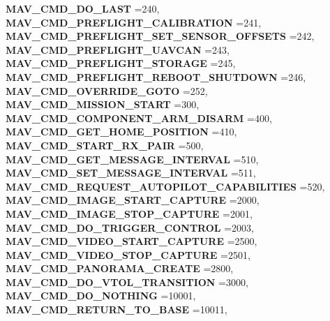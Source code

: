 \begin{DoxyCompactItemize}
\textbf{ M\+A\+V\+\_\+\+C\+M\+D\+\_\+\+D\+O\+\_\+\+L\+A\+ST} =240, 
\textbf{ M\+A\+V\+\_\+\+C\+M\+D\+\_\+\+P\+R\+E\+F\+L\+I\+G\+H\+T\+\_\+\+C\+A\+L\+I\+B\+R\+A\+T\+I\+ON} =241, 
\newline
\textbf{ M\+A\+V\+\_\+\+C\+M\+D\+\_\+\+P\+R\+E\+F\+L\+I\+G\+H\+T\+\_\+\+S\+E\+T\+\_\+\+S\+E\+N\+S\+O\+R\+\_\+\+O\+F\+F\+S\+E\+TS} =242, 
\textbf{ M\+A\+V\+\_\+\+C\+M\+D\+\_\+\+P\+R\+E\+F\+L\+I\+G\+H\+T\+\_\+\+U\+A\+V\+C\+AN} =243, 
\textbf{ M\+A\+V\+\_\+\+C\+M\+D\+\_\+\+P\+R\+E\+F\+L\+I\+G\+H\+T\+\_\+\+S\+T\+O\+R\+A\+GE} =245, 
\textbf{ M\+A\+V\+\_\+\+C\+M\+D\+\_\+\+P\+R\+E\+F\+L\+I\+G\+H\+T\+\_\+\+R\+E\+B\+O\+O\+T\+\_\+\+S\+H\+U\+T\+D\+O\+WN} =246, 
\newline
\textbf{ M\+A\+V\+\_\+\+C\+M\+D\+\_\+\+O\+V\+E\+R\+R\+I\+D\+E\+\_\+\+G\+O\+TO} =252, 
\textbf{ M\+A\+V\+\_\+\+C\+M\+D\+\_\+\+M\+I\+S\+S\+I\+O\+N\+\_\+\+S\+T\+A\+RT} =300, 
\textbf{ M\+A\+V\+\_\+\+C\+M\+D\+\_\+\+C\+O\+M\+P\+O\+N\+E\+N\+T\+\_\+\+A\+R\+M\+\_\+\+D\+I\+S\+A\+RM} =400, 
\textbf{ M\+A\+V\+\_\+\+C\+M\+D\+\_\+\+G\+E\+T\+\_\+\+H\+O\+M\+E\+\_\+\+P\+O\+S\+I\+T\+I\+ON} =410, 
\newline
\textbf{ M\+A\+V\+\_\+\+C\+M\+D\+\_\+\+S\+T\+A\+R\+T\+\_\+\+R\+X\+\_\+\+P\+A\+IR} =500, 
\textbf{ M\+A\+V\+\_\+\+C\+M\+D\+\_\+\+G\+E\+T\+\_\+\+M\+E\+S\+S\+A\+G\+E\+\_\+\+I\+N\+T\+E\+R\+V\+AL} =510, 
\textbf{ M\+A\+V\+\_\+\+C\+M\+D\+\_\+\+S\+E\+T\+\_\+\+M\+E\+S\+S\+A\+G\+E\+\_\+\+I\+N\+T\+E\+R\+V\+AL} =511, 
\textbf{ M\+A\+V\+\_\+\+C\+M\+D\+\_\+\+R\+E\+Q\+U\+E\+S\+T\+\_\+\+A\+U\+T\+O\+P\+I\+L\+O\+T\+\_\+\+C\+A\+P\+A\+B\+I\+L\+I\+T\+I\+ES} =520, 
\newline
\textbf{ M\+A\+V\+\_\+\+C\+M\+D\+\_\+\+I\+M\+A\+G\+E\+\_\+\+S\+T\+A\+R\+T\+\_\+\+C\+A\+P\+T\+U\+RE} =2000, 
\textbf{ M\+A\+V\+\_\+\+C\+M\+D\+\_\+\+I\+M\+A\+G\+E\+\_\+\+S\+T\+O\+P\+\_\+\+C\+A\+P\+T\+U\+RE} =2001, 
\textbf{ M\+A\+V\+\_\+\+C\+M\+D\+\_\+\+D\+O\+\_\+\+T\+R\+I\+G\+G\+E\+R\+\_\+\+C\+O\+N\+T\+R\+OL} =2003, 
\textbf{ M\+A\+V\+\_\+\+C\+M\+D\+\_\+\+V\+I\+D\+E\+O\+\_\+\+S\+T\+A\+R\+T\+\_\+\+C\+A\+P\+T\+U\+RE} =2500, 
\newline
\textbf{ M\+A\+V\+\_\+\+C\+M\+D\+\_\+\+V\+I\+D\+E\+O\+\_\+\+S\+T\+O\+P\+\_\+\+C\+A\+P\+T\+U\+RE} =2501, 
\textbf{ M\+A\+V\+\_\+\+C\+M\+D\+\_\+\+P\+A\+N\+O\+R\+A\+M\+A\+\_\+\+C\+R\+E\+A\+TE} =2800, 
\textbf{ M\+A\+V\+\_\+\+C\+M\+D\+\_\+\+D\+O\+\_\+\+V\+T\+O\+L\+\_\+\+T\+R\+A\+N\+S\+I\+T\+I\+ON} =3000, 
\textbf{ M\+A\+V\+\_\+\+C\+M\+D\+\_\+\+D\+O\+\_\+\+N\+O\+T\+H\+I\+NG} =10001, 
\newline
\textbf{ M\+A\+V\+\_\+\+C\+M\+D\+\_\+\+R\+E\+T\+U\+R\+N\+\_\+\+T\+O\+\_\+\+B\+A\+SE} =10011, 

\end{DoxyCompactItemize}

